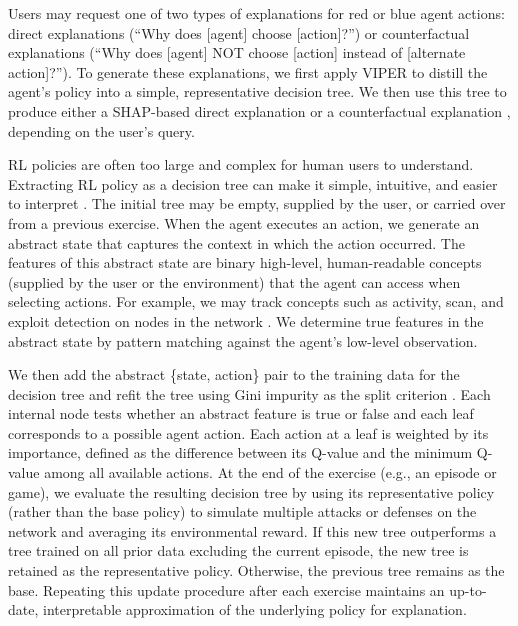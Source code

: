 Users may request one of two types of explanations for red or blue agent actions: direct explanations (“Why does [agent] choose [action]?”) or counterfactual explanations (“Why does [agent] NOT choose [action] instead of [alternate action]?”). 
To generate these explanations, we first apply VIPER \cite{bastani2018verifiable} to distill the agent’s policy into a simple, representative decision tree. 
We then use this tree to produce either a SHAP-based direct explanation \cite{b3} or a counterfactual explanation \cite{b4}, depending on the user’s query.

RL policies are often too large and complex for human users to understand. Extracting RL policy as a decision tree can make it simple, intuitive, and easier to interpret \cite{b2}.
The initial tree may be empty, supplied by the user, or carried over from a previous exercise.
When the agent executes an action, we generate an abstract state that captures the context in which the action occurred. 
The features of this abstract state are binary high-level, human-readable concepts (supplied by the user or the environment) that the agent can access when selecting actions.
For example, we may track concepts such as activity, scan, and exploit detection on nodes in the network \cite{b5}. 
We determine true features in the abstract state by pattern matching against the agent's low-level observation.

We then add the abstract \{state, action\} pair to the training data for the decision tree and refit the tree using Gini impurity as the split criterion \cite{b6}.
Each internal node tests whether an abstract feature is true or false and each leaf corresponds to a possible agent action. 
Each action at a leaf is weighted by its importance, defined as the difference between its Q-value and the minimum Q-value among all available actions.
At the end of the exercise (e.g., an episode or game), we evaluate the resulting decision tree by using its representative policy (rather than the base policy) to simulate multiple attacks or defenses on the network and averaging its environmental reward.
If this new tree outperforms a tree trained on all prior data excluding the current episode, the new tree is retained as the representative policy.
Otherwise, the previous tree remains as the base. 
Repeating this update procedure after each exercise maintains an up-to-date, interpretable approximation of the underlying policy for explanation.

